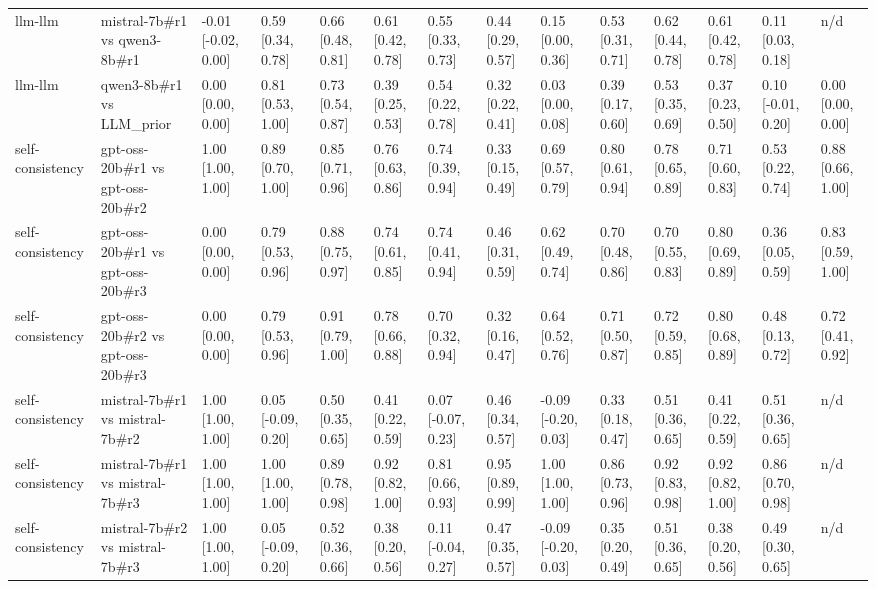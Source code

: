 \begin{table}
{\begin{tabular}{llllllllllllll}
llm-llm & mistral-7b\#r1 vs qwen3-8b\#r1 & -0.01 [-0.02, 0.00] & 0.59 [0.34, 0.78] & 0.66 [0.48, 0.81] & 0.61 [0.42, 0.78] & 0.55 [0.33, 0.73] & 0.44 [0.29, 0.57] & 0.15 [0.00, 0.36] & 0.53 [0.31, 0.71] & 0.62 [0.44, 0.78] & 0.61 [0.42, 0.78] & 0.11 [0.03, 0.18] & n/d \\
llm-llm & qwen3-8b\#r1 vs LLM\_prior & 0.00 [0.00, 0.00] & 0.81 [0.53, 1.00] & 0.73 [0.54, 0.87] & 0.39 [0.25, 0.53] & 0.54 [0.22, 0.78] & 0.32 [0.22, 0.41] & 0.03 [0.00, 0.08] & 0.39 [0.17, 0.60] & 0.53 [0.35, 0.69] & 0.37 [0.23, 0.50] & 0.10 [-0.01, 0.20] & 0.00 [0.00, 0.00] \\
self-consistency & gpt-oss-20b\#r1 vs gpt-oss-20b\#r2 & 1.00 [1.00, 1.00] & 0.89 [0.70, 1.00] & 0.85 [0.71, 0.96] & 0.76 [0.63, 0.86] & 0.74 [0.39, 0.94] & 0.33 [0.15, 0.49] & 0.69 [0.57, 0.79] & 0.80 [0.61, 0.94] & 0.78 [0.65, 0.89] & 0.71 [0.60, 0.83] & 0.53 [0.22, 0.74] & 0.88 [0.66, 1.00] \\
self-consistency & gpt-oss-20b\#r1 vs gpt-oss-20b\#r3 & 0.00 [0.00, 0.00] & 0.79 [0.53, 0.96] & 0.88 [0.75, 0.97] & 0.74 [0.61, 0.85] & 0.74 [0.41, 0.94] & 0.46 [0.31, 0.59] & 0.62 [0.49, 0.74] & 0.70 [0.48, 0.86] & 0.70 [0.55, 0.83] & 0.80 [0.69, 0.89] & 0.36 [0.05, 0.59] & 0.83 [0.59, 1.00] \\
self-consistency & gpt-oss-20b\#r2 vs gpt-oss-20b\#r3 & 0.00 [0.00, 0.00] & 0.79 [0.53, 0.96] & 0.91 [0.79, 1.00] & 0.78 [0.66, 0.88] & 0.70 [0.32, 0.94] & 0.32 [0.16, 0.47] & 0.64 [0.52, 0.76] & 0.71 [0.50, 0.87] & 0.72 [0.59, 0.85] & 0.80 [0.68, 0.89] & 0.48 [0.13, 0.72] & 0.72 [0.41, 0.92] \\
self-consistency & mistral-7b\#r1 vs mistral-7b\#r2 & 1.00 [1.00, 1.00] & 0.05 [-0.09, 0.20] & 0.50 [0.35, 0.65] & 0.41 [0.22, 0.59] & 0.07 [-0.07, 0.23] & 0.46 [0.34, 0.57] & -0.09 [-0.20, 0.03] & 0.33 [0.18, 0.47] & 0.51 [0.36, 0.65] & 0.41 [0.22, 0.59] & 0.51 [0.36, 0.65] & n/d \\
self-consistency & mistral-7b\#r1 vs mistral-7b\#r3 & 1.00 [1.00, 1.00] & 1.00 [1.00, 1.00] & 0.89 [0.78, 0.98] & 0.92 [0.82, 1.00] & 0.81 [0.66, 0.93] & 0.95 [0.89, 0.99] & 1.00 [1.00, 1.00] & 0.86 [0.73, 0.96] & 0.92 [0.83, 0.98] & 0.92 [0.82, 1.00] & 0.86 [0.70, 0.98] & n/d \\
self-consistency & mistral-7b\#r2 vs mistral-7b\#r3 & 1.00 [1.00, 1.00] & 0.05 [-0.09, 0.20] & 0.52 [0.36, 0.66] & 0.38 [0.20, 0.56] & 0.11 [-0.04, 0.27] & 0.47 [0.35, 0.57] & -0.09 [-0.20, 0.03] & 0.35 [0.20, 0.49] & 0.51 [0.36, 0.65] & 0.38 [0.20, 0.56] & 0.49 [0.30, 0.65] & n/d \\

\end{tabular}}
\end{table}

